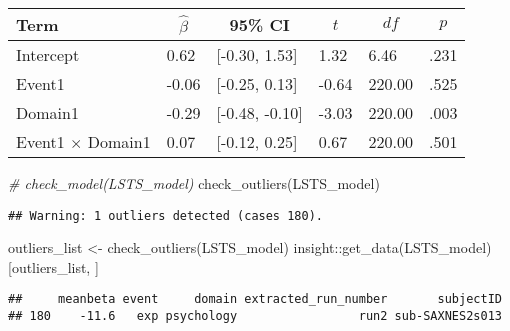 \documentclass[
]{article}
\newenvironment{Shaded}{\begin{snugshade}}{\end{snugshade}}
\newcommand{\CommentTok}[1]{\textcolor[rgb]{0.56,0.35,0.01}{\textit{#1}}}
\newcommand{\FunctionTok}[1]{\textcolor[rgb]{0.00,0.00,0.00}{#1}}
\newcommand{\NormalTok}[1]{#1}
\newcommand{\OtherTok}[1]{\textcolor[rgb]{0.56,0.35,0.01}{#1}}
\newcommand{\SpecialCharTok}[1]{\textcolor[rgb]{0.00,0.00,0.00}{#1}}
\begin{document}
\begin{table}[tbp]

\begin{center}
\begin{threeparttable}

\caption{\label{tab:unnamed-chunk-14}}

\begin{tabular}{llllll}
\toprule
Term & \multicolumn{1}{c}{$\hat{\beta}$} & \multicolumn{1}{c}{95\% CI} & \multicolumn{1}{c}{$t$} & \multicolumn{1}{c}{$\mathit{df}$} & \multicolumn{1}{c}{$p$}\\
\midrule
Intercept & 0.62 & {}[-0.30, 1.53] & 1.32 & 6.46 & .231\\
Event1 & -0.06 & {}[-0.25, 0.13] & -0.64 & 220.00 & .525\\
Domain1 & -0.29 & {}[-0.48, -0.10] & -3.03 & 220.00 & .003\\
Event1 $\times$ Domain1 & 0.07 & {}[-0.12, 0.25] & 0.67 & 220.00 & .501\\
\bottomrule
\end{tabular}

\end{threeparttable}
\end{center}

\end{table}

\begin{Shaded}
\begin{Highlighting}[]
\CommentTok{\# check\_model(LSTS\_model)}
\FunctionTok{check\_outliers}\NormalTok{(LSTS\_model)}
\end{Highlighting}
\end{Shaded}

\begin{verbatim}
## Warning: 1 outliers detected (cases 180).
\end{verbatim}

\begin{Shaded}
\begin{Highlighting}[]
\NormalTok{outliers\_list }\OtherTok{\textless{}{-}} \FunctionTok{check\_outliers}\NormalTok{(LSTS\_model)}
\NormalTok{insight}\SpecialCharTok{::}\FunctionTok{get\_data}\NormalTok{(LSTS\_model)[outliers\_list, ]}
\end{Highlighting}
\end{Shaded}

\begin{verbatim}
##     meanbeta event     domain extracted_run_number       subjectID
## 180    -11.6   exp psychology                 run2 sub-SAXNES2s013
\end{verbatim}
\end{document}
